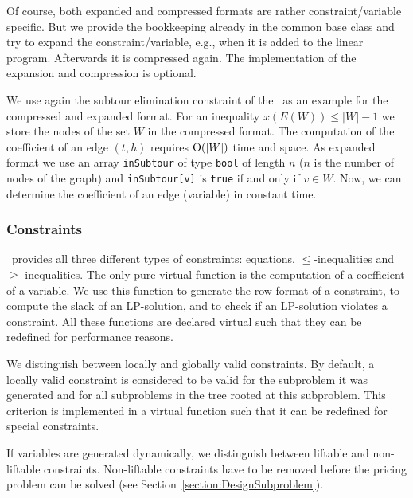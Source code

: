 Of course, both expanded and compressed formats are rather 
constraint/variable specific. But we provide the bookkeeping
already in the common base
class and try to expand the
constraint/variable, e.g., when it is added to the linear program.
Afterwards it is compressed again.
The implementation of the expansion and compression is optional.

We use again the 
subtour elimination constraint
of the \tsp\ as an example for the compressed
and expanded format. For an inequality $x(E(W)) \le |W| - 1$ we store
the nodes of the set $W$ in the compressed format. The computation
of the coefficient of an edge $(t,h)$ requires $\hbox{O}(|W|)$ time
and space.
As expanded format we use an array 
{\tt inSubtour} of type {\tt bool} of length $n$ ($n$
is the number of nodes of the graph) and 
{\tt inSubtour[v]} is {\tt true} if and only if
$v\in W$. Now, we can determine the coefficient of an edge (variable) 
in constant time.


\subsubsection{Constraints}

\ABACUS\ provides all three different types of constraints: 
equations, $\le$-inequalities and 
$\ge$-inequalities. The only pure virtual function
is the computation of a coefficient of a variable. We use this
function to generate the row format of a constraint, to compute
the slack of an LP-solution, and to check if
an LP-solution violates a constraint. All these functions are declared virtual
such that they can be redefined for performance reasons.

We distinguish between locally and globally valid constraints. 
By default,
a locally valid constraint is considered to be valid for the subproblem it
was generated and for all subproblems in the tree rooted at this subproblem.
This criterion is implemented in a virtual function such that it can be
redefined for special constraints.

If variables are generated dynamically, we distinguish between 
liftable
and non-liftable constraints. Non-liftable constraints have to be removed
before the pricing problem can be solved (see 
Section~\ref{section:DesignSubproblem}).

